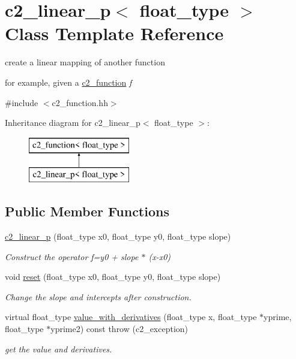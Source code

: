 \hypertarget{classc2__linear__p}{\section{c2\-\_\-linear\-\_\-p$<$ float\-\_\-type $>$ Class Template Reference}
\label{classc2__linear__p}
}


create a linear mapping of another function

for example, given a \hyperlink{classc2__function}{c2\-\_\-function} {\itshape f}  




{\ttfamily \#include $<$c2\-\_\-function.\-hh$>$}

Inheritance diagram for c2\-\_\-linear\-\_\-p$<$ float\-\_\-type $>$\-:\begin{figure}[H]
\begin{center}
\leavevmode
\includegraphics[height=2.000000cm]{classc2__linear__p}
\end{center}
\end{figure}
\subsection*{Public Member Functions}
\begin{DoxyCompactItemize}
\item 
\hyperlink{classc2__linear__p_a6a76eba066b8f52636fd4b6cc7307b06}{c2\-\_\-linear\-\_\-p} (float\-\_\-type x0, float\-\_\-type y0, float\-\_\-type slope)
\begin{DoxyCompactList}\small\item\em Construct the operator f=y0 + slope $\ast$ (x-\/x0) \end{DoxyCompactList}\item 
void \hyperlink{classc2__linear__p_ada2849448ebb2b5b493f45a2db6ab908}{reset} (float\-\_\-type x0, float\-\_\-type y0, float\-\_\-type slope)
\begin{DoxyCompactList}\small\item\em Change the slope and intercepts after construction. \end{DoxyCompactList}\item 
virtual float\-\_\-type \hyperlink{classc2__linear__p_a1d6ce127c8e991c4293f530f341ce617}{value\-\_\-with\-\_\-derivatives} (float\-\_\-type x, float\-\_\-type $\ast$yprime, float\-\_\-type $\ast$yprime2) const   throw (c2\-\_\-exception)
\begin{DoxyCompactList}\small\item\em get the value and derivatives. \end{DoxyCompactList}\end{DoxyCompactItemize}
